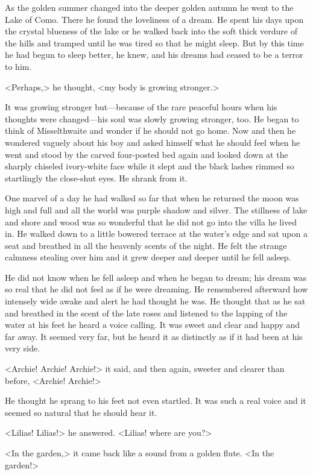 As the golden summer changed into the deeper golden autumn he went to the Lake of Como. There he found the loveliness of a dream. He spent his days upon the crystal blueness of the lake or he walked back into the soft thick verdure of the hills and tramped until he was tired so that he might sleep. But by this time he had begun to sleep better, he knew, and his dreams had ceased to be a terror to him.

<Perhaps,> he thought, <my body is growing stronger.>

It was growing stronger but—because of the rare peaceful hours when his thoughts were changed—his soul was slowly growing stronger, too. He began to think of Misselthwaite and wonder if he should not go home. Now and then he wondered vaguely about his boy and asked himself what he should feel when he went and stood by the carved four-posted bed again and looked down at the sharply chiseled ivory-white face while it slept and the black lashes rimmed so startlingly the close-shut eyes. He shrank from it.

One marvel of a day he had walked so far that when he returned the moon was high and full and all the world was purple shadow and silver. The stillness of lake and shore and wood was so wonderful that he did not go into the villa he lived in. He walked down to a little bowered terrace at the water's edge and sat upon a seat and breathed in all the heavenly scents of the night. He felt the strange calmness stealing over him and it grew deeper and deeper until he fell asleep.

He did not know when he fell asleep and when he began to dream; his dream was so real that he did not feel as if he were dreaming. He remembered afterward how intensely wide awake and alert he had thought he was. He thought that as he sat and breathed in the scent of the late roses and listened to the lapping of the water at his feet he heard a voice calling. It was sweet and clear and happy and far away. It seemed very far, but he heard it as distinctly as if it had been at his very side.

<Archie! Archie! Archie!> it said, and then again, sweeter and clearer than before, <Archie! Archie!>

He thought he sprang to his feet not even startled. It was such a real voice and it seemed so natural that he should hear it.

<Lilias! Lilias!> he answered. <Lilias! where are you?>

<In the garden,> it came back like a sound from a golden flute. <In the garden!>


